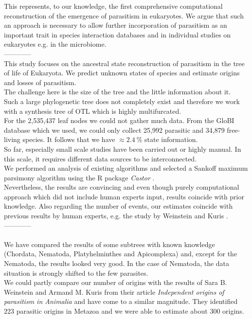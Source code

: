   This represents, to our knowledge, the first comprehensive computational reconstruction of the 
    emergence of parasitism in eukaryotes. We argue that such an approach is necessary to allow 
    further incorporation of parasitism as an important trait in species interaction databases and 
    in individual studies on eukaryotes e.g. in the microbiome. \\

  ------------ \\

  This study focuses on the ancestral state reconstruction of parasitism in the tree of life of
    Eukaryota. We predict unknown states of species and estimate origins and losses of parasitism. \\
  The challenge here is the size of the tree and the little information about it. \\
  Such a large phylogenetic tree does not completely exist and therefore we work with a synthesis 
    tree of OTL \cite{Hinchliff2015} which is highly multifurcated. \\
  For the 2,535,437 leaf nodes we could not gather much data. From the GloBI database 
    \cite{Poelen2014} which we used, we could only collect 25,992 parasitic and 34,879 free-living 
    species. It follows that we have $\approx 2.4~\%$ state information. \\
  So far, especially small scale studies have been carried out or highly manual. In this scale, it 
    requires different data sources to be interconnected. \\
  We performed an analysis of existing algorithms and selected a Sankoff maximum parsimony algorithm 
    using the R package \textit{Castor} \cite{Louca2017}. \\
  Nevertheless, the results are convincing and even though purely computational approach which did 
    not include human experts input, results coincide with prior knowledge. Also regarding the number 
    of events, our estimates coincide with previous results by human experts, e.g. the study by 
    Weinstein and Kuris \cite{Weinstein2016}. \\

  ------------ \\

   \\
  We have compared the results of some subtrees with known knowledge (Chordata, Nematoda, 
    Platyhelminthes and Apicomplexa) and, except for the Nematoda, the results looked very good. In 
    the case of Nematoda, the data situation is strongly shifted to the few parasites. \\
  We could partly compare our number of origins with the results of Sara B. Weinstein and Armand M. 
  Kuris from their article \textit{Independent origins of parasitism in Animalia}  
    and have come to a similar magnitude. They identified 223 parasitic origins in Metazoa and we 
    were able to estimate about 300 origins. \\

